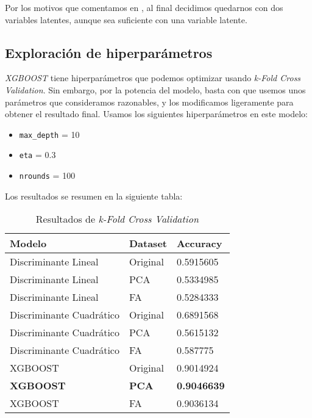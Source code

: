 Por los motivos que comentamos en , al final decidimos quedarnos con dos variables latentes, aunque sea suficiente con una variable latente.

\subsection{Exploración de hiperparámetros} \label{section:hiperparametros}

\textit{XGBOOST} tiene hiperparámetros que podemos optimizar usando \textit{k-Fold Cross Validation}. Sin embargo, por la potencia del modelo, basta con que usemos unos parámetros que consideramos razonables, y los modificamos ligeramente para obtener el resultado final. Usamos los siguientes hiperparámetros en este modelo:

\begin{itemize}
    \item \lstinline{max_depth} = 10
    \item \lstinline{eta} = 0.3
    \item \lstinline{nrounds} = 100
\end{itemize}

Los resultados se resumen en la siguiente tabla:

\begin{table}[H]
\centering
\begin{tabular}{|l|l|l|}
    \hline
    Modelo                   & Dataset      & Accuracy      \\
    \hline
    Discriminante Lineal     & Original     & 0.5915605     \\
    Discriminante Lineal     & PCA          & 0.5334985     \\
    Discriminante Lineal     & FA           & 0.5284333     \\
    Discriminante Cuadrático & Original     & 0.6891568     \\
    Discriminante Cuadrático & PCA          & 0.5615132     \\
    Discriminante Cuadrático & FA           & 0.587775      \\
    XGBOOST                  & Original     & 0.9014924     \\
    \textbf{XGBOOST}         & \textbf{PCA} & \textbf{0.9046639} \\
    XGBOOST                  & FA           & 0.9036134     \\
    \hline

\end{tabular}
\caption{Resultados de \textit{k-Fold Cross Validation}}
\label{table:cross_validation}
\end{table}

